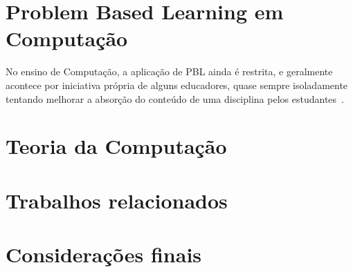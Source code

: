 \section{Problem Based Learning em Computação}
No ensino de Computação, a aplicação de PBL ainda é restrita, e geralmente
acontece por iniciativa própria de alguns educadores,
quase sempre isoladamente tentando melhorar a
absorção do conteúdo de uma disciplina
pelos estudantes~\cite{wood2003problem, o2012practical}.

\section{Teoria da Computação}
\section{Trabalhos relacionados}
\section{Considerações finais}
